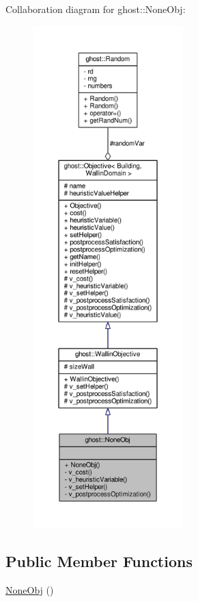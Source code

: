 Collaboration diagram for ghost\-:\-:None\-Obj\-:
\nopagebreak
\begin{figure}[H]
\begin{center}
\leavevmode
\includegraphics[height=550pt]{classghost_1_1NoneObj__coll__graph}
\end{center}
\end{figure}
\subsection*{Public Member Functions}
\begin{DoxyCompactItemize}
\item 
\hyperlink{classghost_1_1NoneObj_a854ee882e283a68bb431758712440c7c}{None\-Obj} ()
\end{DoxyCompactItemize}
